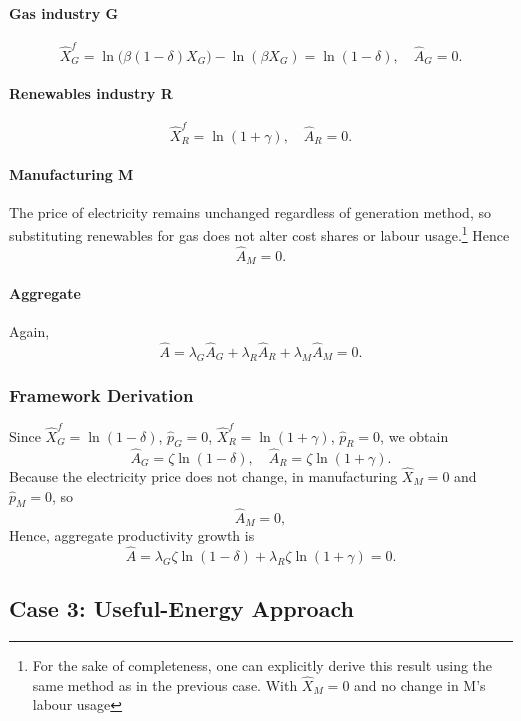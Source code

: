 \documentclass[11pt]{article}
\begin{document}
\paragraph{Gas industry G}
\[
    \hat{X}_G^f
= \ln\bigl(\beta(1-\delta)X_G\bigr)
  - \ln(\beta X_G)
= \ln(1-\delta),
  \quad
  \hat{A}_G=0.
\]

\paragraph{Renewables industry R}
\[
    \hat{X}_R^f = \ln(1+\gamma),
    \quad
    \hat{A}_R = 0.
\]

\paragraph{Manufacturing M}
The price of electricity remains unchanged regardless of generation method, so substituting renewables for gas does not alter cost shares or labour usage.\footnote{For the sake of completeness, one can explicitly derive this result using the same method as in the previous case. With $\hat{X}_M=0$ and no change in M's labour usage} Hence
\[
    \hat{A}_M=0.
\]

\paragraph{Aggregate}
Again,
\begin{equation}
      \hat{A}
= \lambda_G\hat{A}_G
  + \lambda_R\hat{A}_R
  + \lambda_M\hat{A}_M
=0.
\end{equation}
\subsubsection{Framework Derivation}

Since $\hat{X}_G^f=\ln(1-\delta)$, $\hat{p}_G=0$, $\hat{X}_R^f=\ln(1+\gamma)$, $\hat{p}_R=0$, we obtain
\[
    \hat{A}_G = \zeta \ln(1-\delta),
    \quad
    \hat{A}_R = \zeta \ln(1+\gamma).
\]
Because the electricity price does not change, in manufacturing $\hat{X}_M=0$ and $\hat{p}_M=0$, so
\[
    \hat{A}_M=0,
\]
Hence, aggregate productivity growth is
\begin{equation}
    \hat{A}= \lambda_G \zeta \ln(1-\delta) + \lambda_R \zeta \ln(1+\gamma)
=0.
\end{equation}

\subsection{Case 3: Useful-Energy Approach}
\label{subappendix_useful_energy}
\end{document}
